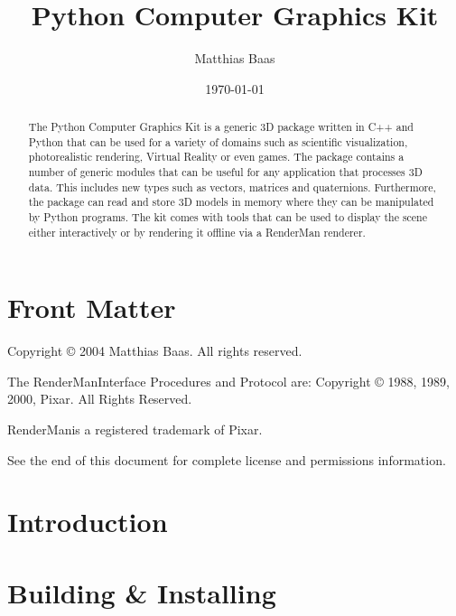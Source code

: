 \documentclass{manual}
\title{Python Computer Graphics Kit}
\author{Matthias Baas}
\date{\today}
\begin{document}
\maketitle

\ifhtml
\chapter*{Front Matter\label{front}}
\fi

Copyright \copyright{} 2004 Matthias Baas.
All rights reserved.

The RenderMan\textregistered Interface Procedures and Protocol are:
Copyright \copyright{} 1988, 1989, 2000, Pixar.
All Rights Reserved.

RenderMan\textregistered is a registered trademark of Pixar.

See the end of this document for complete license and permissions
information.

\begin{abstract}

\noindent
The Python Computer Graphics Kit is a generic 3D package written in
C++ and Python that can be used for a variety of domains such as
scientific visualization, photorealistic rendering, Virtual Reality or
even games.  The package contains a number of generic modules that can
be useful for any application that processes 3D data. This includes
new types such as vectors, matrices and quaternions. Furthermore, the
package can read and store 3D models in memory where they can be
manipulated by Python programs. The kit comes with tools that can be
used to display the scene either interactively or by rendering it
offline via a RenderMan renderer.
\end{abstract}


\tableofcontents


\chapter{Introduction \label{introduction}}




\chapter{Building \& Installing \label{build}}
\end{document}
